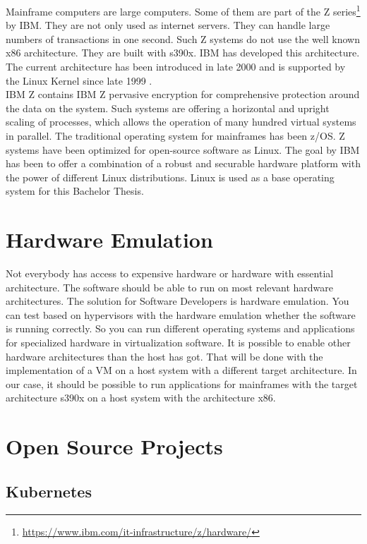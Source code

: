 Mainframe computers are large computers. Some of them are part of the Z series\footnote{\url{https://www.ibm.com/it-infrastructure/z/hardware/}} by IBM. They are not only used as internet servers. They can handle large numbers of transactions in one second\cite[~p.56]{Tanenbaum2014}. Such Z systems do not use the well known x86 architecture. They are built with s390x. IBM has developed this architecture. The current architecture has been introduced in late 2000 and is supported by the Linux Kernel since late 1999 \cite[~p.15]{Block2019}. \\
IBM Z contains IBM Z pervasive encryption for comprehensive protection around the data on the system\cite[~p.4]{Lascu2020}. Such systems are offering a horizontal and upright scaling of processes, which allows the operation of many hundred virtual systems in parallel\cite[~p.13]{Tschoeke2009}. The traditional operating system for mainframes has been z/OS. 
Z systems have been optimized for open-source software as Linux\cite[~p.8]{Lascu2020}. The goal by IBM has been to offer a combination of a robust and securable hardware platform with the power of different Linux distributions. 
Linux is used as a base operating system for this Bachelor Thesis.


\section{Hardware Emulation}

Not everybody has access to expensive hardware or hardware with essential architecture. The software should be able to run on most relevant hardware architectures. The solution for Software Developers is hardware emulation. 
You can test based on hypervisors with the hardware emulation whether the software is running correctly. 
So you can run different operating systems and applications for specialized hardware in virtualization software. 
It is possible to enable other hardware architectures than the host has got. 
That will be done with the implementation of a VM on a host system with a different target architecture\cite[~p.3]{Rosenthal2015}. In our case, it should be possible to run applications for mainframes with the target
architecture s390x on a host system with the architecture x86.


\section{Open Source Projects}

\subsection{Kubernetes}

